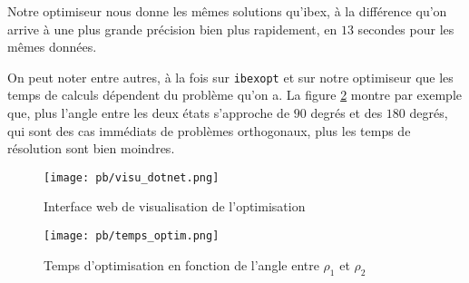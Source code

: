 Notre optimiseur nous donne les mêmes solutions qu'ibex, à la différence qu'on arrive à une plus grande précision bien plus rapidement, en $13$ secondes pour les mêmes données.

On peut noter entre autres, à la fois sur \texttt{ibexopt} et sur notre optimiseur que les temps de calculs dépendent du problème qu'on a. La figure \ref{fig:temps_optim} montre par exemple que, plus l'angle entre les deux états s'approche de $90$ degrés et des $180$ degrés, qui sont des cas immédiats de problèmes orthogonaux, plus les temps de résolution sont bien moindres.

\begin{figure}[H]
    \centering
    \texttt{[image: pb/visu\_dotnet.png]}
    \caption{Interface web de visualisation de l'optimisation}
    \label{fig:visu_dotnet}
\end{figure}

\begin{figure}[H]
    \centering
    \texttt{[image: pb/temps\_optim.png]}
    \caption{Temps d'optimisation en fonction de l'angle entre $\rho_1$ et $\rho_2$}
    \label{fig:temps_optim}
\end{figure}